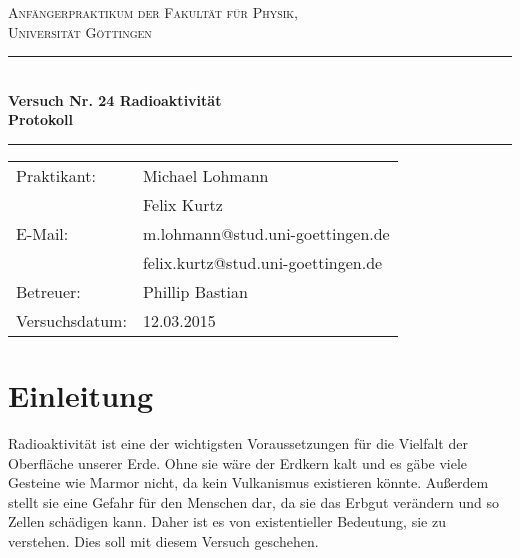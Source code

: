 \documentclass[12pt,a4paper,titlepage,headinclude,bibtotoc]{scrartcl}
\begin{document}
\begin{titlepage}
\centering
\textsc{\Large Anfängerpraktikum der Fakultät für
  Physik,\\[1.5ex] Universität Göttingen}

\vspace*{3cm}

\rule{\textwidth}{1pt}\\[0.5cm]
{\huge \bfseries
  Versuch Nr. 24 Radioaktivität\\[1.5ex]
  Protokoll}\\[0.5cm]
\rule{\textwidth}{1pt}

\vspace*{3cm}

\begin{Large}
\begin{tabular}{ll}
Praktikant: &  Michael Lohmann\\
 &  Felix Kurtz\\
 E-Mail: & m.lohmann@stud.uni-goettingen.de\\
 &  felix.kurtz@stud.uni-goettingen.de\\
 Betreuer: & Phillip Bastian\\
 Versuchsdatum: & 12.03.2015\\
\end{tabular}
\end{Large}

\vspace*{0.8cm}

\begin{Large}
\end{Large}

\end{titlepage}

\tableofcontents

\newpage

\section{Einleitung}
\label{sec:einleitung}
Radioaktivität ist eine der wichtigsten Voraussetzungen für die Vielfalt der Oberfläche unserer Erde.
Ohne sie wäre der Erdkern kalt und es gäbe viele Gesteine wie Marmor nicht, da kein Vulkanismus existieren könnte.
Außerdem stellt sie eine Gefahr für den Menschen dar, da sie das Erbgut verändern und so Zellen schädigen kann.
Daher ist es von existentieller Bedeutung, sie zu verstehen.
Dies soll mit diesem Versuch geschehen.
 
\end{document}
